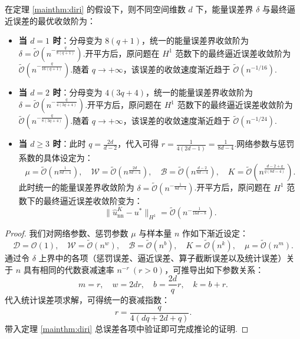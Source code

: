 \begin{corollary}\label{cor:cordiri}
在定理 \ref{mainthm:diri} 的假设下，则不同空间维数 $d$ 下，能量误差界 $\delta$ 与最终逼近误差的最优收敛阶为：

\begin{itemize}
    \item \textbf{当 $d = 1$ 时}：分母变为 $8(q+1)$，统一的能量误差界收敛阶为 $\delta = \widetilde{\mathcal{O}}\left( n^{-\frac{q}{8(q+1)}} \right)$.开平方后，原问题在 $H^1$ 范数下的最终逼近误差收敛阶为 $\widetilde{\mathcal{O}}\left( n^{-\frac{q}{16(q+1)}} \right)$.随着 $q \to +\infty$，该误差的收敛速度渐近趋于 $\widetilde{\mathcal{O}}\left( n^{-1/16} \right)$.
    
    \item \textbf{当 $d = 2$ 时}：分母变为 $4(3q+4)$，统一的能量误差界收敛阶为 $\delta = \widetilde{\mathcal{O}}\left( n^{-\frac{q}{4(3q+4)}} \right)$.开平方后，原问题在 $H^1$ 范数下的最终逼近误差收敛阶为 $\widetilde{\mathcal{O}}\left( n^{-\frac{q}{8(3q+4)}} \right)$.随着 $q \to +\infty$，该误差的收敛速度渐近趋于 $\widetilde{\mathcal{O}}\left( n^{-1/24} \right)$.
    
    \item \textbf{当 $d \geq 3$ 时}：此时 $q = \frac{2d}{d-2}$，代入可得 $r = \frac{1}{4(2d-1)} = \frac{1}{8d-4}$.网络参数与惩罚系数的具体设定为：
    $$ \mu = \widetilde{\mathcal{O}}\left(n^{\frac{1}{8d-4}}\right), \quad \mathcal{W} = \widetilde{\mathcal{O}}\left(n^{\frac{2d}{8d-4}}\right), \quad \mathcal{B} = \widetilde{\mathcal{O}}\left(n^{\frac{d-2}{8d-4}}\right), \quad K = \widetilde{\mathcal{O}}\left(n^{\frac{d-2+q}{q(8d-4)}}\right). $$
    此时统一的能量误差界收敛阶为 $\delta = \widetilde{\mathcal{O}}\left( n^{-\frac{1}{8d-4}} \right)$.开平方后，原问题在 $H^1$ 范数下的最终逼近误差收敛阶变为：
    $$ \|\widehat{u}_{\text{nn}}^K-u^*\|_{H^{1}} = \widetilde{\mathcal{O}}\left( n^{-\frac{1}{16d-8}} \right). $$
\end{itemize}
\end{corollary}
\begin{proof}
我们对网络参数、惩罚参数 $\mu$ 与样本量 $n$ 作如下渐近设定：
$$ \mathcal{D} = \mathcal{O}(1), \quad \mathcal{W} = \widetilde{\mathcal{O}}(n^w), \quad \mathcal{B} = \widetilde{\mathcal{O}}(n^b), \quad K = \widetilde{\mathcal{O}}(n^k), \quad \mu = \widetilde{\mathcal{O}}(n^m). $$
通过令 $\delta$ 上界中的各项（惩罚误差、逼近误差、算子截断误差以及统计误差）关于 $n$ 具有相同的代数衰减速率 $n^{-r} \ (r>0)$，可推导出如下参数关系：
$$ m = r, \quad w = 2dr, \quad b = \frac{2d}{q}r, \quad k = b+r. $$
代入统计误差项求解，可得统一的衰减指数：
\begin{equation*}
r = \frac{q}{4(dq + 2d + q)}.
\end{equation*}
带入定理 \ref{mainthm:diri} 总误差各项中验证即可完成推论的证明.
\end{proof}





